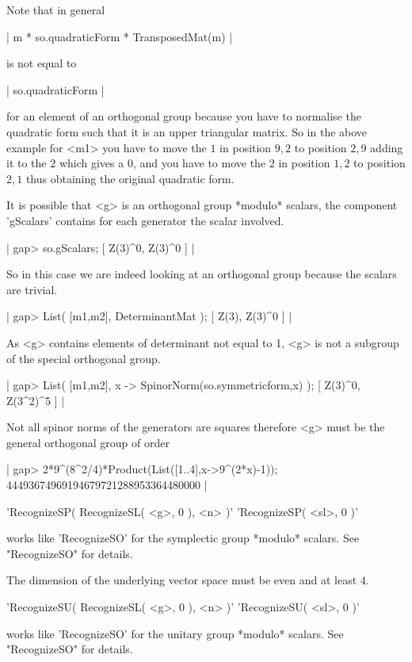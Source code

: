 Note that in general

|    m  * so.quadraticForm *  TransposedMat(m) |

is not equal to

|    so.quadraticForm |

for an element of  an orthogonal group because you  have to normalise the
quadratic form such that it  is an upper   triangular matrix.  So in  the
above example  for <m1> you  have to move  the  $1$ in position  $9,2$ to
position $2,9$ adding it to  the $2$ which gives  a $0$, and you have  to
move the $2$  in  position $1,2$  to position  $2,1$ thus   obtaining the
original quadratic form.

It is  possible that <g>  is an  orthogonal  group *modulo* scalars,  the
component 'gScalars' contains for each generator the scalar involved.

|    gap> so.gScalars;
    [ Z(3)^0, Z(3)^0 ] |

So in this case we are indeed looking at an orthogonal group because the
scalars are trivial.

|    gap> List( [m1,m2], DeterminantMat );
    [ Z(3), Z(3)^0 ] |

As <g> contains elements of determinant not equal to 1, <g> is not a
subgroup of the special orthogonal group.

|    gap> List( [m1,m2], x -> SpinorNorm(so.symmetricform,x) );
    [ Z(3)^0, Z(3^2)^5 ] |

Not all spinor norms of the generators are squares  therefore <g> must be
the general orthogonal group of order

|    gap> 2*9^(8^2/4)*Product(List([1..4],x->9^(2*x)-1));
    44493674969194679721288953364480000 |



'RecognizeSP( RecognizeSL( <g>, 0 ), <n> )'
'RecognizeSP( <sl>, 0 )'

works like 'RecognizeSO' for the symplectic group  *modulo* scalars.  See
"RecognizeSO" for details.

The dimension  of the underlying vector space  must be even  and at least
$4$.



'RecognizeSU( RecognizeSL( <g>, 0 ), <n> )'
'RecognizeSU( <sl>, 0 )'

works like 'RecognizeSO' for  the  unitary group *modulo*  scalars.   See
"RecognizeSO" for details.

